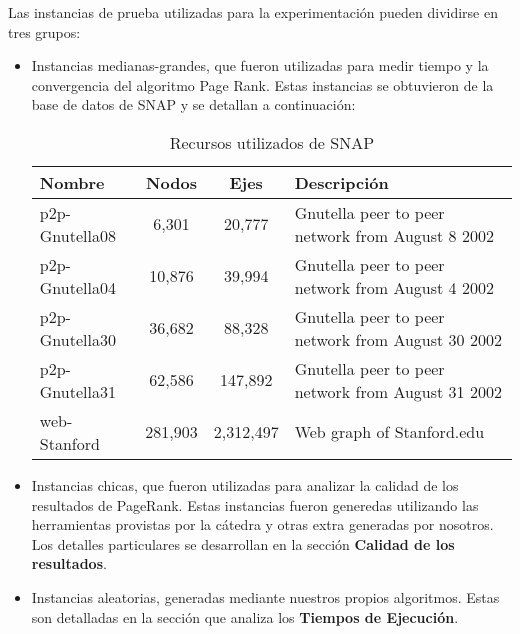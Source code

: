 Las instancias de prueba utilizadas para la experimentación pueden dividirse en tres grupos:
\begin{itemize}
    \item Instancias medianas-grandes, que fueron utilizadas para medir tiempo y la convergencia del algoritmo Page Rank.
        Estas instancias se obtuvieron de la base de datos de SNAP\cite{SNAP} y se detallan a continuación:

        \begin{table}[H]
            \begin{center}
                \begin{tabular}{| l | c | c | l |}
                    \hline
                    Nombre          &Nodos      &Ejes       & Descripción \\ \hline
                    p2p-Gnutella08 	&6,301  	&20,777 	& Gnutella peer to peer network from August 8 2002 \\
                    p2p-Gnutella04 	&10,876  	&39,994 	& Gnutella peer to peer network from August 4 2002 \\
                    p2p-Gnutella30 	&36,682  	&88,328 	& Gnutella peer to peer network from August 30 2002 \\
                    p2p-Gnutella31 	&62,586  	&147,892 	& Gnutella peer to peer network from August 31 2002 \\
                    web-Stanford 	&281,903  	&2,312,497 	& Web graph of Stanford.edu \\
                    \hline
                \end{tabular}
                \captionsetup{justification=centering}
                \caption{Recursos utilizados de SNAP}
                \label{recursos_snap}
            \end{center}
        \end{table}


    \item Instancias chicas, que fueron utilizadas para analizar la calidad de los resultados de PageRank.
        Estas instancias fueron generedas utilizando las herramientas provistas por la cátedra y otras extra generadas por nosotros.
        Los detalles particulares se desarrollan en la sección \textbf{Calidad de los resultados}.

    \item Instancias aleatorias, generadas mediante nuestros propios algoritmos. Estas son detalladas en la sección que analiza los \textbf{Tiempos de Ejecución}.
\end{itemize}


